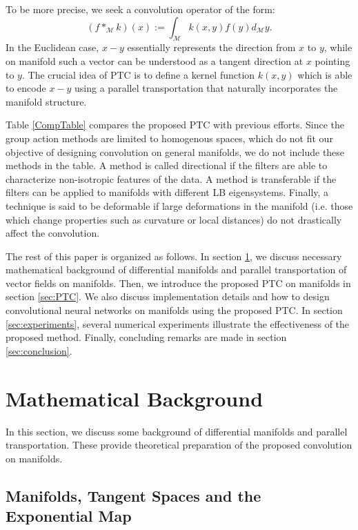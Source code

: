 \documentclass[10pt,twocolumn,letterpaper]{article}
\def\M{\mathcal{M}}
\begin{document}
To be more precise, we seek a convolution operator of the form:
\begin{equation}\label{ManConv}
(f *_{\M} k) (x) := \int_{\M} k(x,y)f(y) d_{\M}y.
\end{equation}
In the Euclidean case, $x-y$ essentially represents the direction from $x$ to $y$, while on manifold such a vector can be understood as a tangent direction at $x$ pointing to $y$. The crucial idea of PTC is to define a kernel function $k(x,y)$ which is able to encode $x-y$ using a parallel transportation that naturally incorporates the manifold structure.

Table \ref{CompTable} compares the proposed PTC with previous efforts. Since the group action methods are limited to homogenous spaces, which do not fit our objective of designing convolution on general manifolds, we do not include these methods in the table. A method is called directional if the filters are able to characterize non-isotropic features of the data. A method is transferable if the filters can be applied to manifolds with different LB eigensystems. Finally, a technique is said to be deformable if large deformations in the manifold (i.e. those which change properties such as curvature or local distances) do not drastically affect the convolution.


The rest of this paper is organized as follows. In section \ref{sec:Math}, we discuss necessary mathematical background of differential manifolds and parallel transportation of vector fields on manifolds. Then, we introduce the proposed PTC on manifolds in section \ref{sec:PTC}. We also discuss implementation details and how to design convolutional neural networks on manifolds using the proposed PTC. In section \ref{sec:experiments}, several numerical experiments illustrate the effectiveness of the proposed method. Finally, concluding remarks are made in section \ref{sec:conclusion}.

\section{Mathematical Background}
\label{sec:Math}
In this section, we discuss some background of differential manifolds and parallel transportation. These provide theoretical preparation of the proposed convolution on manifolds.

\subsection{Manifolds, Tangent Spaces and the Exponential Map}
\end{document}
